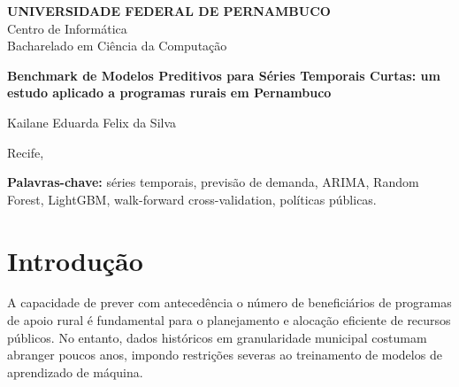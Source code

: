 \documentclass[12pt, a4paper]{article}
\begin{document}
\begin{titlepage}
  \centering
  \vspace*{1cm}

  {\large \textbf{UNIVERSIDADE FEDERAL DE PERNAMBUCO}} \\[0.3cm]
  {\large Centro de Informática} \\[0.3cm]
  {\large Bacharelado em Ciência da Computação} \\

  \vspace{3cm}

  {\Large \textbf{Benchmark de Modelos Preditivos para Séries Temporais Curtas: um estudo aplicado a programas rurais em Pernambuco}} \\

  \vspace{3cm}

  {\large Kailane Eduarda Felix da Silva} \\

  \vfill

  {\large Recife, \the\year}
\end{titlepage}

\newpage
\begin{abstract}
\noindent

\end{abstract}

\vspace{0.5cm}
\noindent\textbf{Palavras-chave:} séries temporais, previsão de demanda,
ARIMA, Random Forest, LightGBM, walk-forward cross-validation,
políticas públicas.

\newpage
\tableofcontents

\newpage
\section{Introdução}
\label{sec:introducao}

A capacidade de prever com antecedência o número de beneficiários de programas
de apoio rural é fundamental para o planejamento e alocação eficiente de recursos
públicos. No entanto, dados históricos em granularidade municipal costumam
abranger poucos anos, impondo restrições severas ao treinamento de modelos de
aprendizado de máquina.
\end{document}
